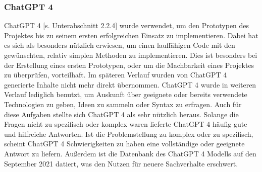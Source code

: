 \subsubsection{ChatGPT 4}
ChatGPT 4 [s. Unterabschnitt 2.2.4] wurde verwendet, um den Prototypen des Projektes bis zu seinem ersten erfolgreichen Einsatz zu implementieren. Dabei hat es sich als besonders nützlich erwiesen, um einen lauffähigen Code mit den gewünschten, relativ simplen Methoden zu implementieren. Dies ist besonders bei der Erstellung eines ersten Prototypen, oder um die Machbarkeit eines Projektes zu überprüfen, vorteilhaft. Im späteren Verlauf wurden von ChatGPT 4 generierte Inhalte nicht mehr direkt übernommen. ChatGPT 4 wurde in weiteren Verlauf lediglich benutzt, um Auskunft über geeignete oder bereits verwendete Technologien zu geben, Ideen zu sammeln oder Syntax zu erfragen. Auch für diese Aufgaben stellte sich ChatGPT 4 als sehr nützlich heraus. Solange die Fragen nicht zu spezifisch oder komplex waren lieferte ChatGPT 4 häufig gute und hilfreiche Antworten. Ist die Problemstellung zu komplex oder zu spezifisch, scheint ChatGPT 4 Schwierigkeiten zu haben eine vollständige oder geeignete Antwort zu liefern. Außerdem ist die Datenbank des ChatGPT 4 Modells auf den September 2021 datiert, was den Nutzen für neuere Sachverhalte erschwert.